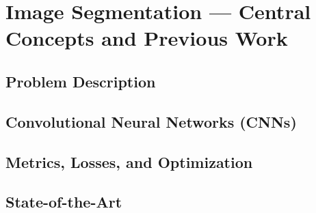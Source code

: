 \section{Image Segmentation --- Central Concepts and Previous Work}%
\label{sec:segmentation}


\subsection{Problem Description}%
\label{sec:segmentation-description}


\subsection{Convolutional Neural Networks (CNNs)}%
\label{sec:cnn}
  
  
  
  
  

\subsection{Metrics, Losses, and Optimization}%
\label{sec:segmentation-metrics}

  

  

  

  

\newpage
\subsection{State-of-the-Art}%
\label{sec:state-of-the-art}

